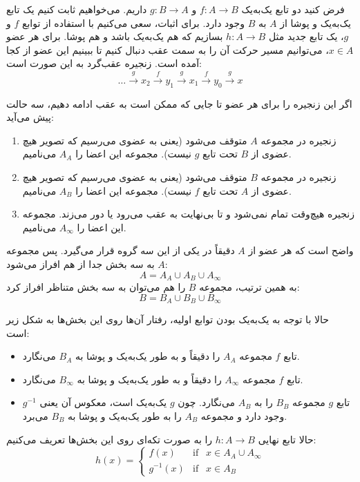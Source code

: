 
فرض کنید دو تابع یک‌به‌یک $f: A \to B$ و $g: B \to A$ داریم. می‌خواهیم ثابت کنیم یک تابع یک‌به‌یک و پوشا از $A$ به $B$ وجود دارد.
برای اثبات، سعی می‌کنیم با استفاده از توابع $f$ و $g$، یک تابع جدید مثل $h: A \to B$ بسازیم که هم یک‌به‌یک باشد و هم پوشا.
برای هر عضو $x \in A$، می‌توانیم مسیر حرکت آن را به سمت عقب دنبال کنیم تا ببینیم این عضو از کجا آمده است. زنجیره عقب‌گرد به این صورت است:
\[
\dots \xrightarrow{g} x_2 \xrightarrow{f} y_1 \xrightarrow{g} x_1 \xrightarrow{f} y_0 \xrightarrow{g} x
\]

اگر این زنجیره را برای هر عضو تا جایی که ممکن است به عقب ادامه دهیم، سه حالت پیش می‌آید:
\begin{enumerate}
    \item زنجیره در مجموعه $A$ متوقف می‌شود (یعنی به عضوی می‌رسیم که تصویر هیچ عضوی از $B$ تحت تابع $g$ نیست). مجموعه این اعضا را $A_A$ می‌نامیم.
    \item زنجیره در مجموعه $B$ متوقف می‌شود (یعنی به عضوی می‌رسیم که تصویر هیچ عضوی از $A$ تحت تابع $f$ نیست). مجموعه این اعضا را $A_B$ می‌نامیم.
    \item زنجیره هیچ‌وقت تمام نمی‌شود و تا بی‌نهایت به عقب می‌رود یا دور می‌زند. مجموعه این اعضا را $A_\infty$ می‌نامیم.
\end{enumerate}

واضح است که هر عضو از $A$ دقیقاً در یکی از این سه گروه قرار می‌گیرد. پس مجموعه $A$ به سه بخش جدا از هم افراز می‌شود:
\[
A = A_A \cup A_B \cup A_\infty
\]
به همین ترتیب، مجموعه $B$ را هم می‌توان به سه بخش متناظر افراز کرد:
\[
B = B_A \cup B_B \cup B_\infty
\]

حالا با توجه به یک‌به‌یک بودن توابع اولیه، رفتار آن‌ها روی این بخش‌ها به شکل زیر است:
\begin{itemize}
    \item تابع $f$ مجموعه $A_A$ را دقیقاً و به طور یک‌به‌یک و پوشا به $B_A$ می‌نگارد.
    \item تابع $f$ مجموعه $A_\infty$ را دقیقاً و به طور یک‌به‌یک و پوشا به $B_\infty$ می‌نگارد.
    \item تابع $g$ مجموعه $B_B$ را به $A_B$ می‌نگارد. چون $g$ یک‌به‌یک است، معکوس آن یعنی $g^{-1}$ وجود دارد و مجموعه $A_B$ را به طور یک‌به‌یک و پوشا به $B_B$ می‌برد.
\end{itemize}

حالا تابع نهایی $h: A \to B$ را به صورت تکه‌ای روی این بخش‌ها تعریف می‌کنیم:
\[
h(x) = \begin{cases} 
f(x) & \text{if } \ \ x \in A_A \cup A_\infty \\ 
g^{-1}(x) & \text{if } \ \ x \in A_B 
\end{cases}
\]

